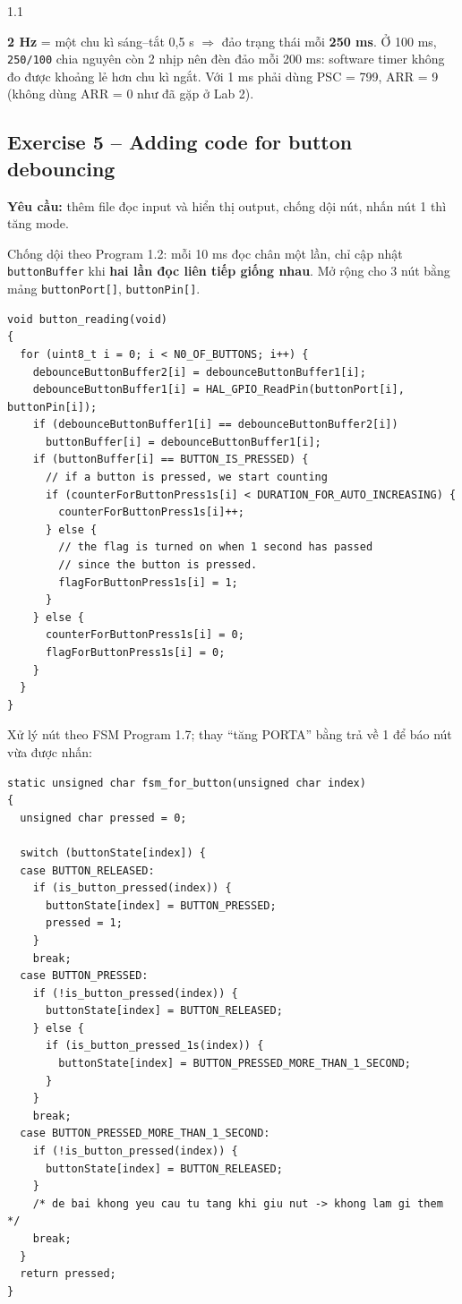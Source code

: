\documentclass[a4paper,12pt]{article}
\begin{document}
\begin{spacing}{1.1}
\begin{ghichu}
\textbf{2 Hz} = một chu kì sáng--tắt 0,5 s $\Rightarrow$ đảo trạng thái mỗi \textbf{250 ms}.
Ở 100 ms, \texttt{250/100} chia nguyên còn 2 nhịp nên đèn đảo mỗi 200 ms: software timer không đo được
khoảng lẻ hơn chu kì ngắt. Với 1 ms phải dùng PSC = 799, ARR = 9 (không dùng ARR = 0 như đã gặp ở Lab 2).
\end{ghichu}

\subsection*{Exercise 5 -- Adding code for button debouncing}

\textbf{Yêu cầu:} thêm file đọc input và hiển thị output, chống dội nút, nhấn nút 1 thì tăng mode.

Chống dội theo Program 1.2: mỗi 10 ms đọc chân một lần, chỉ cập nhật \texttt{buttonBuffer}
khi \textbf{hai lần đọc liên tiếp giống nhau}. Mở rộng cho 3 nút bằng mảng \texttt{buttonPort[]}, \texttt{buttonPin[]}.

\begin{lstlisting}[caption={Exercise 5 -- input\_reading.c}]
void button_reading(void)
{
  for (uint8_t i = 0; i < N0_OF_BUTTONS; i++) {
    debounceButtonBuffer2[i] = debounceButtonBuffer1[i];
    debounceButtonBuffer1[i] = HAL_GPIO_ReadPin(buttonPort[i], buttonPin[i]);
    if (debounceButtonBuffer1[i] == debounceButtonBuffer2[i])
      buttonBuffer[i] = debounceButtonBuffer1[i];
    if (buttonBuffer[i] == BUTTON_IS_PRESSED) {
      // if a button is pressed, we start counting
      if (counterForButtonPress1s[i] < DURATION_FOR_AUTO_INCREASING) {
        counterForButtonPress1s[i]++;
      } else {
        // the flag is turned on when 1 second has passed
        // since the button is pressed.
        flagForButtonPress1s[i] = 1;
      }
    } else {
      counterForButtonPress1s[i] = 0;
      flagForButtonPress1s[i] = 0;
    }
  }
}
\end{lstlisting}

Xử lý nút theo FSM Program 1.7; thay ``tăng PORTA'' bằng trả về 1 để báo nút vừa được nhấn:

\begin{lstlisting}[caption={Exercise 5 -- input\_processing.c: FSM nut nhan}]
static unsigned char fsm_for_button(unsigned char index)
{
  unsigned char pressed = 0;

  switch (buttonState[index]) {
  case BUTTON_RELEASED:
    if (is_button_pressed(index)) {
      buttonState[index] = BUTTON_PRESSED;
      pressed = 1;
    }
    break;
  case BUTTON_PRESSED:
    if (!is_button_pressed(index)) {
      buttonState[index] = BUTTON_RELEASED;
    } else {
      if (is_button_pressed_1s(index)) {
        buttonState[index] = BUTTON_PRESSED_MORE_THAN_1_SECOND;
      }
    }
    break;
  case BUTTON_PRESSED_MORE_THAN_1_SECOND:
    if (!is_button_pressed(index)) {
      buttonState[index] = BUTTON_RELEASED;
    }
    /* de bai khong yeu cau tu tang khi giu nut -> khong lam gi them */
    break;
  }
  return pressed;
}
\end{lstlisting}


\end{spacing}
\end{document}
